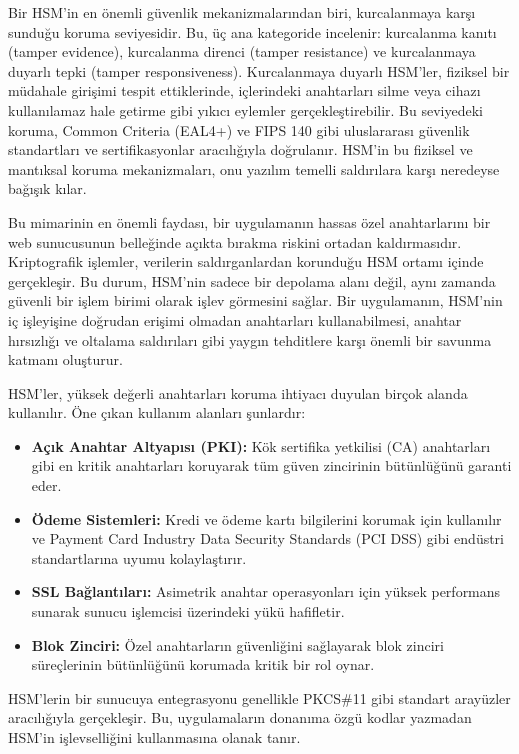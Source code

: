 Bir HSM'in en önemli güvenlik mekanizmalarından biri, kurcalanmaya karşı sunduğu koruma seviyesidir. Bu, üç ana kategoride incelenir: kurcalanma kanıtı (tamper evidence), kurcalanma direnci (tamper resistance) ve kurcalanmaya duyarlı tepki (tamper responsiveness). Kurcalanmaya duyarlı HSM'ler, fiziksel bir müdahale girişimi tespit ettiklerinde, içlerindeki anahtarları silme veya cihazı kullanılamaz hale getirme gibi yıkıcı eylemler gerçekleştirebilir. Bu seviyedeki koruma, Common Criteria (EAL4+) ve FIPS 140 gibi uluslararası güvenlik standartları ve sertifikasyonlar aracılığıyla doğrulanır. HSM'in bu fiziksel ve mantıksal koruma mekanizmaları, onu yazılım temelli saldırılara karşı neredeyse bağışık kılar.

Bu mimarinin en önemli faydası, bir uygulamanın hassas özel anahtarlarını bir web sunucusunun belleğinde açıkta bırakma riskini ortadan kaldırmasıdır. Kriptografik işlemler, verilerin saldırganlardan korunduğu HSM ortamı içinde gerçekleşir. Bu durum, HSM'nin sadece bir depolama alanı değil, aynı zamanda güvenli bir işlem birimi olarak işlev görmesini sağlar. Bir uygulamanın, HSM'nin iç işleyişine doğrudan erişimi olmadan anahtarları kullanabilmesi, anahtar hırsızlığı ve oltalama saldırıları gibi yaygın tehditlere karşı önemli bir savunma katmanı oluşturur.

HSM'ler, yüksek değerli anahtarları koruma ihtiyacı duyulan birçok alanda kullanılır. Öne çıkan kullanım alanları şunlardır:
\begin{itemize}
    \item \textbf{Açık Anahtar Altyapısı (PKI):} Kök sertifika yetkilisi (CA) anahtarları gibi en kritik anahtarları koruyarak tüm güven zincirinin bütünlüğünü garanti eder.
    \item \textbf{Ödeme Sistemleri:} Kredi ve ödeme kartı bilgilerini korumak için kullanılır ve Payment Card Industry Data Security Standards (PCI DSS) gibi endüstri standartlarına uyumu kolaylaştırır.
    \item \textbf{SSL Bağlantıları:} Asimetrik anahtar operasyonları için yüksek performans sunarak sunucu işlemcisi üzerindeki yükü hafifletir.
    \item \textbf{Blok Zinciri:} Özel anahtarların güvenliğini sağlayarak blok zinciri süreçlerinin bütünlüğünü korumada kritik bir rol oynar.
\end{itemize}
HSM'lerin bir sunucuya entegrasyonu genellikle PKCS\#11 gibi standart arayüzler aracılığıyla gerçekleşir. Bu, uygulamaların donanıma özgü kodlar yazmadan HSM'in işlevselliğini kullanmasına olanak tanır.

